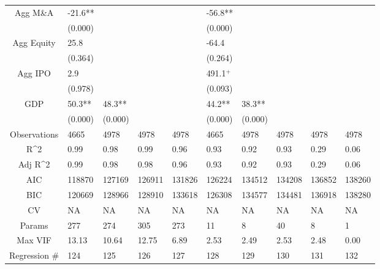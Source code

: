 \documentclass{article}
\begin{document}
\begin{table}[H]
\begin{tabular}{|clllllllll|}
  Agg M\&A & -21.6** &  &  &  & -56.8** &  &  &  &  \\ 
   & (0.000) &  &  &  & (0.000) &  &  &  &  \\ 
  Agg Equity & 25.8 &  &  &  & -64.4 &  &  &  &  \\ 
   & (0.364) &  &  &  & (0.264) &  &  &  &  \\ 
  Agg IPO & 2.9 &  &  &  & 491.1$^{+}$ &  &  &  &  \\ 
   & (0.978) &  &  &  & (0.093) &  &  &  &  \\ 
  GDP & 50.3** & 48.3** &  &  & 44.2** & 38.3** &  &  &  \\ 
   & (0.000) & (0.000) &  &  & (0.000) & (0.000) &  &  &  \\ 
  \hline 
 Observations & 4665 & 4978 & 4978 & 4978 & 4665 & 4978 & 4978 & 4978 & 4978 \\ 
  R^2 & 0.99 & 0.98 & 0.99 & 0.96 & 0.93 & 0.92 & 0.93 & 0.29 & 0.06 \\ 
  Adj R^2 & 0.99 & 0.98 & 0.98 & 0.96 & 0.93 & 0.92 & 0.93 & 0.29 & 0.06 \\ 
  AIC & 118870 & 127169 & 126911 & 131826 & 126224 & 134512 & 134208 & 136852 & 138260 \\ 
  BIC & 120669 & 128966 & 128910 & 133618 & 126308 & 134577 & 134481 & 136918 & 138280 \\ 
  CV & NA & NA & NA & NA & NA & NA & NA & NA & NA \\ 
  Params & 277 & 274 & 305 & 273 & 11 & 8 & 40 & 8 & 1 \\ 
  Max VIF & 13.13 & 10.64 & 12.75 & 6.89 & 2.53 & 2.49 & 2.53 & 2.48 & 0.00 \\ 
  Regression \# & 124 & 125 & 126 & 127 & 128 & 129 & 130 & 131 & 132 \\ 
   \hline
\end{tabular}
 
\end{table}
\end{document}
